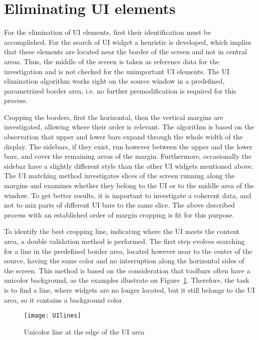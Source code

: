 \documentclass[draft,final]{vutinfth} %
\begin{document}
	\section{Eliminating UI elements}
	For the elimination of UI elements, first their identification must be accomplished. 
	For the search of UI widget a heuristic is developed, which implies that these elements are located near the border of the screen and not in central areas.
	Thus, the middle of the screen is taken as reference data for the investigation and is not checked for the unimportant UI elements.
	The UI elimination algorithm works right on the source window in a predefined, parametrized border area, i.e. no further premodification is required for this process.\par
	Cropping the borders, first the horizontal, then the vertical margins are investigated, allowing where their order is relevant.
	The algorithm is based on the observation that upper and lower bars expand through the whole width of the display.
	The sidebars, if they exist, run however between the upper and the lower bars, and cover the remaining areas of the margin.
	Furthermore, occasionally the sidebar have a slightly different style than the other UI widgets mentioned above.
	The UI matching method investigates slices of the screen running along the margins and examines whether they belong to the UI or to the middle area of the window.
	To get better results, it is important to investigate a coherent data, and not to mix parts of different UI bars to the same slice.
	The above described process with an established order of margin cropping is fit for this purpose. \par 
	To identify the best cropping line, indicating where the UI meets the content area, a double validation method is performed.
	The first step evolves searching for a line in the predefined border area, located however near to the center of the source, having the same color and no interruption along the horizontal sides of the screen.
	This method is based on the consideration that toolbars often have a unicolor background, as the examples illustrate on Figure~\ref{fig:lines}.
	Therefore, the task is to find a line, where widgets are no longer located, but it still belongs to the UI area, so it contains a background color.\par
	\begin{figure}[h]
		\centering		
		\texttt{[image: UIlines]}
		\caption{Unicolor line at the edge of the UI area}
		\label{fig:lines}
	\end{figure}
\end{document}

